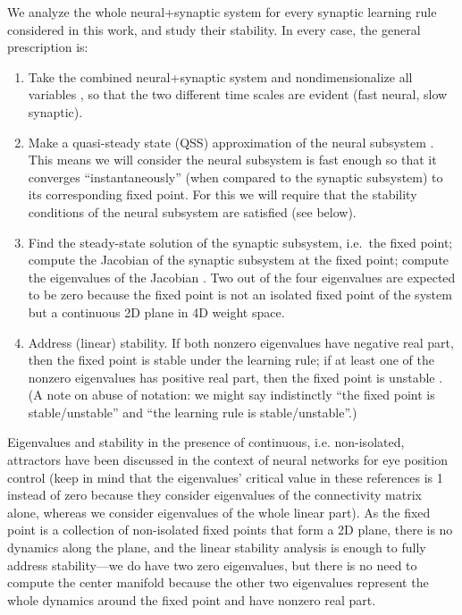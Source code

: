 \documentclass[twocolumn]{article}
\begin{document}
We analyze the whole neural+synaptic system for every synaptic learning rule considered in this work, and study their stability. In every case, the general prescription is:
\begin{enumerate}
\item Take the combined neural+synaptic system and nondimensionalize all variables \cite[see Sections 1.2 and 1.4 of Ref.\ ][]{Keener1998}\cite[see Section 3.5 of Ref.\ ][]{Strogatz2018}, so that the two different time scales are evident (fast neural, slow synaptic).
\item Make a quasi-steady state (QSS) approximation of the neural subsystem \cite{Keener1998,Strogatz2018}. This means we will consider the neural subsystem is fast enough so that it converges ``instantaneously'' (when compared to the synaptic subsystem) to its corresponding fixed point. 
For this we will require that the stability conditions of the neural subsystem are satisfied (see below).
\item Find the steady-state solution of the synaptic subsystem, i.e.\ the fixed point; compute the Jacobian of the synaptic subsystem at the fixed point; compute the eigenvalues of the Jacobian \cite{Strogatz2018,Wiggins1996}. Two out of the four eigenvalues are expected to be zero because the fixed point is not an isolated fixed point of the system but a continuous 2D plane in 4D weight space.
\item Address (linear) stability. If both nonzero eigenvalues have negative real part, then the fixed point is stable under the learning rule; if at least one of the nonzero eigenvalues has positive real part, then the fixed point is unstable \cite{Strogatz2018,Wiggins1996}. (A note on abuse of notation: we might say indistinctly ``the fixed point is stable/unstable'' and ``the learning rule is stable/unstable''.)
\end{enumerate}

Eigenvalues and stability in the presence of continuous, i.e. non-isolated, attractors have been discussed in the context of neural networks for eye position control \cite{Seung1996,Seung1998} (keep in mind that the eigenvalues' critical value in these references is 1 instead of zero because they consider eigenvalues of the connectivity matrix alone, whereas we consider eigenvalues of the whole linear part). As the fixed point is a collection of non-isolated fixed points that form a 2D plane, there is no dynamics along the plane, and the linear stability analysis is enough to fully address stability---we do have two zero eigenvalues, but there is no need to compute the center manifold \cite{Wiggins1996} because the other two eigenvalues represent the whole dynamics around the fixed point and have nonzero real part.
\end{document}
